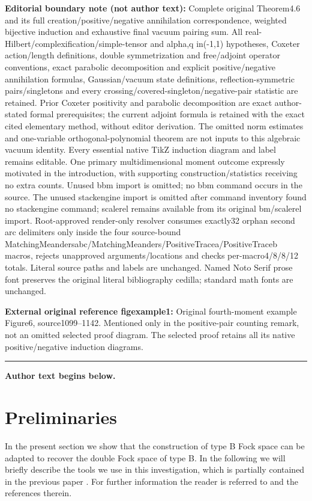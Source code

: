 \documentclass[11pt]{article}
\numberwithin{equation}{section}
\numberwithin{equation}{section}
\begin{document}
\medskip\noindent\textbf{Editorial boundary note (not author text):} Complete original Theorem4.6 and its full creation/positive/negative annihilation correspondence, weighted bijective induction and exhaustive final vacuum pairing sum. All real-Hilbert/complexification/simple-tensor and alpha,q in(-1,1) hypotheses, Coxeter action/length definitions, double symmetrization and free/adjoint operator conventions, exact parabolic decomposition and explicit positive/negative annihilation formulas, Gaussian/vacuum state definitions, reflection-symmetric pairs/singletons and every crossing/covered-singleton/negative-pair statistic are retained. Prior Coxeter positivity and parabolic decomposition are exact author-stated formal prerequisites; the current adjoint formula is retained with the exact cited elementary method, without editor derivation. The omitted norm estimates and one-variable orthogonal-polynomial theorem are not inputs to this algebraic vacuum identity. Every essential native TikZ induction diagram and label remains editable. One primary multidimensional moment outcome expressly motivated in the introduction, with supporting construction/statistics receiving no extra counts. Unused bbm import is omitted; no bbm command occurs in the source. The unused stackengine import is omitted after command inventory found no stackengine command; scalerel remains available from its original bm/scalerel import. Root-approved render-only resolver consumes exactly32 orphan second arc delimiters only inside the four source-bound MatchingMeandersabc/MatchingMeanders/PositiveTracea/PositiveTraceb macros, rejects unapproved arguments/locations and checks per-macro4/8/8/12 totals. Literal source paths and labels are unchanged. Named Noto Serif prose font preserves the original literal bibliography cedilla; standard math fonts are unchanged.\par
\noindent\textbf{External original reference figexample1:} Original fourth-moment example Figure6, source1099–1142. Mentioned only in the positive-pair counting remark, not an omitted selected proof diagram. The selected proof retains all its native positive/negative induction diagrams.\par
\medskip\hrule\medskip\noindent\textbf{Author text begins below.}\par
\setcounter{section}{1}
\section{Preliminaries }
\label{sec:preliminaries}
In the present section we show that the construction of type B Fock space \cite{BozejkoEjsmontHasebe2015} can be adapted to recover the
double Fock space of type B.
In the following we will briefly describe the tools we use in this investigation,
which is partially contained in the previous paper \cite{BozejkoEjsmontHasebe2015}.
For further information the reader is referred to \cite{BozejkoEjsmontHasebe2015} and the references therein.
\end{document}
